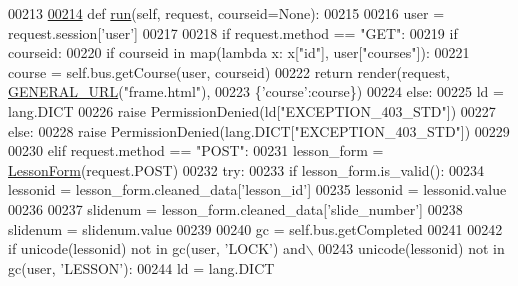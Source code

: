 \begin{DoxyCode}
00213 
\hypertarget{CourseUnit_8py_source_l00214}{}\hyperlink{classCourse_1_1CourseUnit_1_1UiCourse_aaaf2b8229f2b774f12e719bc0e6f13cb}{00214}     \textcolor{keyword}{def }\hyperlink{classCourse_1_1CourseUnit_1_1UiCourse_aaaf2b8229f2b774f12e719bc0e6f13cb}{run}(self, request, courseid=None):
00215         
00216         user = request.session[\textcolor{stringliteral}{'user'}]
00217 
00218         \textcolor{keywordflow}{if} request.method == \textcolor{stringliteral}{"GET"}:
00219             \textcolor{keywordflow}{if} courseid:
00220                 \textcolor{keywordflow}{if} courseid \textcolor{keywordflow}{in} map(\textcolor{keyword}{lambda} x: x[\textcolor{stringliteral}{"id"}], user[\textcolor{stringliteral}{"courses"}]):
00221                     course = self.bus.getCourse(user, courseid)
00222                     \textcolor{keywordflow}{return} render(request, \hyperlink{namespaceCourse_1_1macros_a9a69c2455c0c121b1c01960629575d7e}{GENERAL\_URL}(\textcolor{stringliteral}{"frame.html"}), 
00223                         \{\textcolor{stringliteral}{'course'}:course\})
00224                 \textcolor{keywordflow}{else}:
00225                     ld = lang.DICT
00226                     \textcolor{keywordflow}{raise} PermissionDenied(ld[\textcolor{stringliteral}{"EXCEPTION\_403\_STD"}])
00227             \textcolor{keywordflow}{else}:   
00228                 \textcolor{keywordflow}{raise} PermissionDenied(lang.DICT[\textcolor{stringliteral}{"EXCEPTION\_403\_STD"}])
00229 
00230         \textcolor{keywordflow}{elif} request.method == \textcolor{stringliteral}{"POST"}:
00231             lesson\_form = \hyperlink{classCourse_1_1forms_1_1LessonForm}{LessonForm}(request.POST)
00232             \textcolor{keywordflow}{try}:
00233                 \textcolor{keywordflow}{if} lesson\_form.is\_valid():
00234                     lessonid = lesson\_form.cleaned\_data[\textcolor{stringliteral}{'lesson\_id'}]
00235                     lessonid = lessonid.value
00236 
00237                     slidenum = lesson\_form.cleaned\_data[\textcolor{stringliteral}{'slide\_number'}]
00238                     slidenum = slidenum.value
00239 
00240                     gc = self.bus.getCompleted
00241 
00242                     \textcolor{keywordflow}{if} unicode(lessonid) \textcolor{keywordflow}{not} \textcolor{keywordflow}{in} gc(user, \textcolor{stringliteral}{'LOCK'}) \textcolor{keywordflow}{and}\(\backslash\)
00243                        unicode(lessonid) \textcolor{keywordflow}{not} \textcolor{keywordflow}{in} gc(user, \textcolor{stringliteral}{'LESSON'}):
00244                             ld = lang.DICT

\end{DoxyCode}
